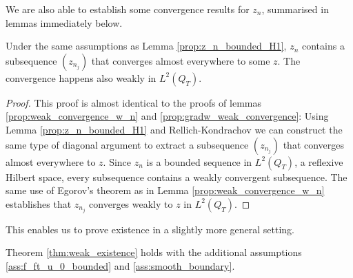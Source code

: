 \documentclass[11pt, a4paper]{article}
\begin{document}
We are also able to establish some convergence results for $z_n$, summarised in lemmas immediately below.

\begin{lemma}
\label{prop:z_n_weak_convergence}
Under the same assumptions as Lemma \ref{prop:z_n_bounded_H1}, $z_n$ contains a subsequence $(z_{n_j})$ that converges almost everywhere to some $z$. The convergence happens also weakly in $L^2(Q_T)$. 
\end{lemma}

\begin{proof}
This proof is almost identical to the proofs of lemmas \ref{prop:weak_convergence_w_n} and \ref{prop:gradw_weak_convergence}: Using Lemma \ref{prop:z_n_bounded_H1} and Rellich-Kondrachov we can construct the same type of diagonal argument to extract a subsequence $(z_{n_j})$ that converges almost everywhere to $z$. Since $z_n$ is a bounded sequence in $L^2(Q_T)$, a reflexive Hilbert space, every subsequence contains a weakly convergent subsequence. The same use of Egorov's theorem as in Lemma \ref{prop:weak_convergence_w_n} establishes that $z_{n_j}$ converges weakly to $z$ in $L^2(Q_T)$.
\end{proof}


This enables us to prove existence in a slightly more general setting.
\begin{lemma}
\label{lem:weak_existence_part2}
Theorem \ref{thm:weak_existence} holds with the additional assumptions \ref{ass:f_ft_u_0_bounded} and \ref{ass:smooth_boundary}.
\end{lemma}
\end{document}
